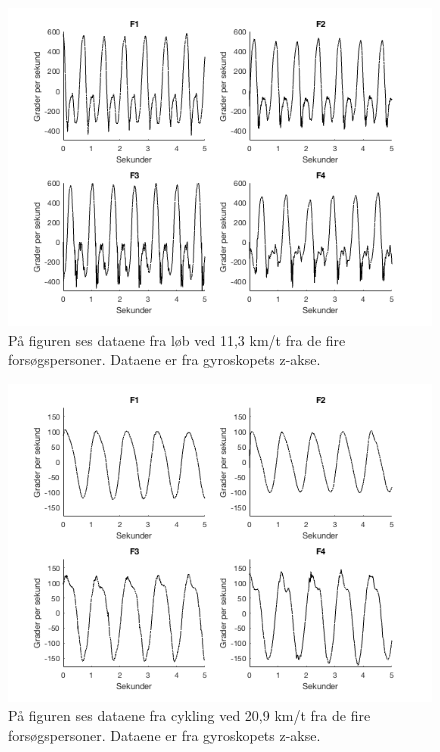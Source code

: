 \begin{figure}[H]
	\centering
	\includegraphics[scale=0.5]{figures/qBilag/loeb_gyro}
	\caption{På figuren ses dataene fra løb ved 11,3 km/t fra de fire forsøgspersoner. Dataene er fra gyroskopets z-akse.}
	\label{fig:Ap_cykling2}
\end{figure}\vspace{-.25cm}

\begin{figure}[H]
	\centering
	\includegraphics[scale=0.5]{figures/qBilag/cykling_gyro}
	\caption{På figuren ses dataene fra cykling ved 20,9 km/t fra de fire forsøgspersoner. Dataene er fra gyroskopets z-akse.}
	\label{fig:Ap_cykling3}
\end{figure}\vspace{-.25cm}

